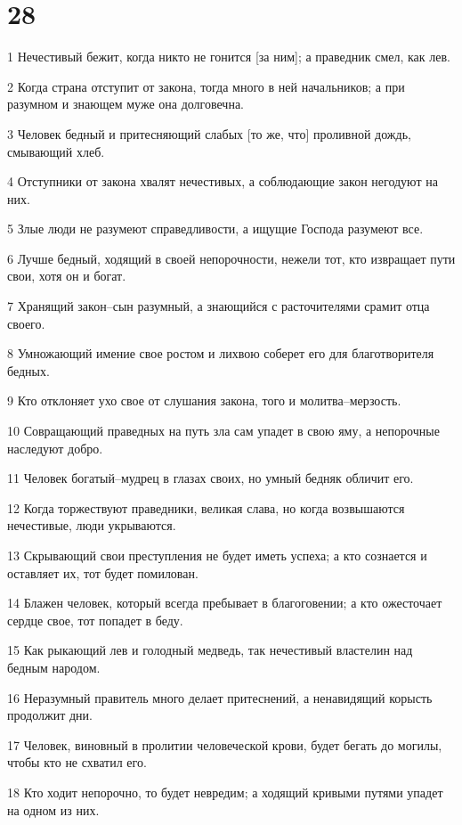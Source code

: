 \chapter{28}

\par 1 Нечестивый бежит, когда никто не гонится [за ним]; а праведник смел, как лев.
\par 2 Когда страна отступит от закона, тогда много в ней начальников; а при разумном и знающем муже она долговечна.
\par 3 Человек бедный и притесняющий слабых [то же, что] проливной дождь, смывающий хлеб.
\par 4 Отступники от закона хвалят нечестивых, а соблюдающие закон негодуют на них.
\par 5 Злые люди не разумеют справедливости, а ищущие Господа разумеют все.
\par 6 Лучше бедный, ходящий в своей непорочности, нежели тот, кто извращает пути свои, хотя он и богат.
\par 7 Хранящий закон--сын разумный, а знающийся с расточителями срамит отца своего.
\par 8 Умножающий имение свое ростом и лихвою соберет его для благотворителя бедных.
\par 9 Кто отклоняет ухо свое от слушания закона, того и молитва--мерзость.
\par 10 Совращающий праведных на путь зла сам упадет в свою яму, а непорочные наследуют добро.
\par 11 Человек богатый--мудрец в глазах своих, но умный бедняк обличит его.
\par 12 Когда торжествуют праведники, великая слава, но когда возвышаются нечестивые, люди укрываются.
\par 13 Скрывающий свои преступления не будет иметь успеха; а кто сознается и оставляет их, тот будет помилован.
\par 14 Блажен человек, который всегда пребывает в благоговении; а кто ожесточает сердце свое, тот попадет в беду.
\par 15 Как рыкающий лев и голодный медведь, так нечестивый властелин над бедным народом.
\par 16 Неразумный правитель много делает притеснений, а ненавидящий корысть продолжит дни.
\par 17 Человек, виновный в пролитии человеческой крови, будет бегать до могилы, чтобы кто не схватил его.
\par 18 Кто ходит непорочно, то будет невредим; а ходящий кривыми путями упадет на одном из них.
